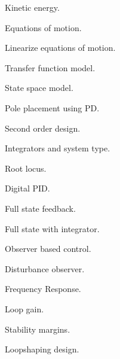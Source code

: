 
	

\par{}
\begin{multicols}{2}
\begin{description}
\setlength{\itemsep}{0pt}
\setlength{\parskip}{0pt}
	\item {\bf{}} Kinetic energy.
	\item {\bf{}} Equations of motion.
	\item {\bf{}} Linearize equations of motion.
	\item {\bf{}} Transfer function model.
	\item {\bf{}} State space model.
	\item {\bf{}} Pole placement using PD.
	\item {\bf{}} Second order design.
	\item {\bf{}} Integrators and system type.
	\item {\bf{}} Root locus.
	\item {\bf{}} Digital PID.
	\item {\bf{}} Full state feedback.
	\item {\bf{}} Full state with integrator.
	\item {\bf{}} Observer based control.
	\item {\bf{}} Disturbance observer.
	\item {\bf{}} Frequency Response.
	\item {\bf{}} Loop gain.
	\item {\bf{}} Stability margins.
	\item {\bf{}} Loopshaping design.
\end{description}
\end{multicols}

